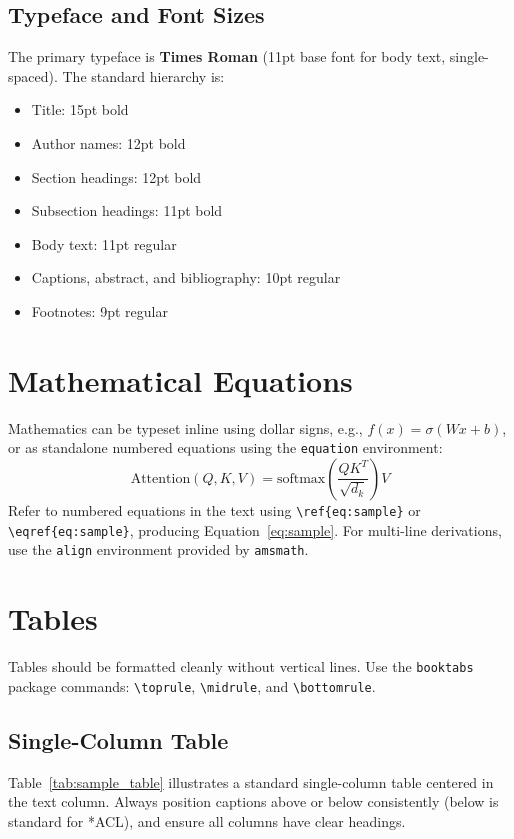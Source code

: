 \documentclass[11pt]{article}
\begin{document}
\subsection{Typeface and Font Sizes}
The primary typeface is \textbf{Times Roman} (11pt base font for body text, single-spaced). The standard hierarchy is:
\begin{itemize}
    \item Title: 15pt bold
    \item Author names: 12pt bold
    \item Section headings: 12pt bold
    \item Subsection headings: 11pt bold
    \item Body text: 11pt regular
    \item Captions, abstract, and bibliography: 10pt regular
    \item Footnotes: 9pt regular
\end{itemize}

\section{Mathematical Equations}
\label{sec:math}

Mathematics can be typeset inline using dollar signs, e.g., $f(x) = \sigma(W x + b)$, or as standalone numbered equations using the \texttt{equation} environment:
\begin{equation}
    \label{eq:sample}
    \text{Attention}(Q, K, V) = \text{softmax}\left(\frac{Q K^T}{\sqrt{d_k}}\right) V
\end{equation}
Refer to numbered equations in the text using \verb|\ref{eq:sample}| or \verb|\eqref{eq:sample}|, producing Equation~\ref{eq:sample}. For multi-line derivations, use the \texttt{align} environment provided by \texttt{amsmath}.

\section{Tables}
\label{sec:tables}

Tables should be formatted cleanly without vertical lines. Use the \texttt{booktabs} package commands: \verb|\toprule|, \verb|\midrule|, and \verb|\bottomrule|. 

\subsection{Single-Column Table}
Table~\ref{tab:sample_table} illustrates a standard single-column table centered in the text column. Always position captions above or below consistently (below is standard for *ACL), and ensure all columns have clear headings.
\end{document}
